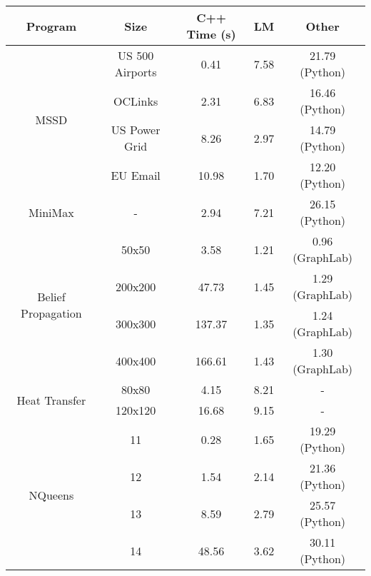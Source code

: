 \begin{tabular}{c | c || c | c | c} \hline
	\textbf{Program} & \textbf{Size} & \textbf{C++ Time} (s) & \textbf{LM} & \textbf{Other} \\ \hline \hline
	\multirow{4}{*}{MSSD}  & US 500 Airports &  0.41  &  7.58  &  21.79 (Python) \\
		 & OCLinks &  2.31  &  6.83  &  16.46 (Python) \\
		 & US Power Grid &  8.26  &  2.97  &  14.79 (Python) \\
		 & EU Email &  10.98  &  1.70  &  12.20 (Python) \\
	\hline
	MiniMax  & - &  2.94  &  7.21  &  26.15 (Python) \\
	\hline
	\multirow{4}{*}{Belief Propagation}  & 50x50 &  3.58  &  1.21  &  0.96 (GraphLab) \\
		 & 200x200 &  47.73  &  1.45  &  1.29 (GraphLab) \\
		 & 300x300 &  137.37  &  1.35  &  1.24 (GraphLab) \\
		 & 400x400 &  166.61  &  1.43  &  1.30 (GraphLab) \\
	\hline
	\multirow{2}{*}{Heat Transfer}  & 80x80 &  4.15  &  8.21  &  - \\
		 & 120x120 &  16.68  &  9.15  &  - \\
	\hline
	\multirow{4}{*}{NQueens}  & 11 &  0.28  &  1.65  &  19.29 (Python) \\
		 & 12 &  1.54  &  2.14  &  21.36 (Python) \\
		 & 13 &  8.59  &  2.79  &  25.57 (Python) \\
		 & 14 &  48.56  &  3.62  &  30.11 (Python) \\
	\hline
\end{tabular}
